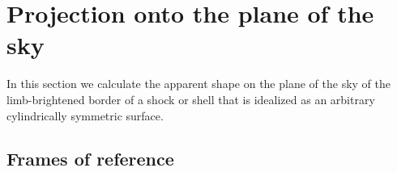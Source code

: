
\section{Projection onto the plane of the sky}
\label{sec:projection}

In this section we calculate the apparent shape on the plane of the
sky of the limb-brightened border of a shock or shell that is
idealized as an arbitrary cylindrically symmetric surface.


\subsection{Frames of reference}
\label{sec:ref-frames}

